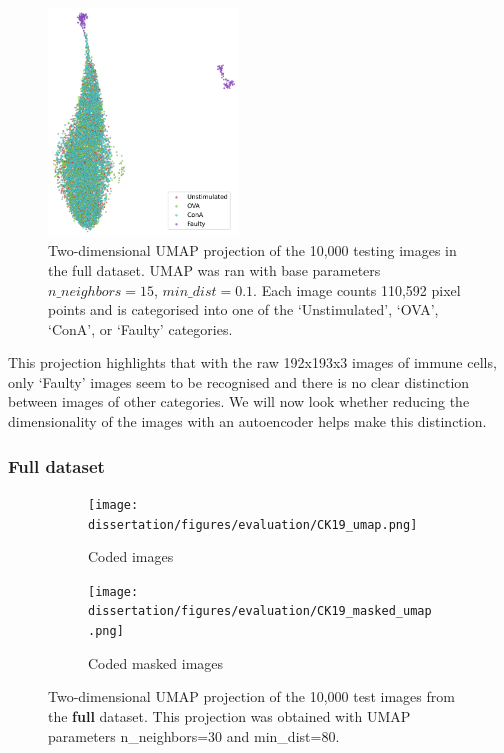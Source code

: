 \begin{figure}[h!]
    \centering
    \includegraphics[width=0.45\textwidth]{dissertation/figures/evaluation/CK19_baseline_visualisation.png}
    \caption{Two-dimensional UMAP projection of the 10,000 testing images in the full dataset. UMAP was ran with base parameters $n\_neighbors=15$, $min\_dist=0.1$. Each image counts 110,592 pixel points and is categorised into one of the `Unstimulated', `OVA', `ConA', or `Faulty' categories.}
    \label{fig:baseline_vis}
\end{figure}

This projection highlights that with the raw 192x193x3 images of immune cells, only `Faulty' images seem to be recognised and there is no clear distinction between images of other categories. We will now look whether reducing the dimensionality of the images with an autoencoder helps make this distinction.

\bigskip
\subsubsection{Full dataset}
\hfill
\hfill

\begin{figure}[h!]
    \centering
    \begin{subfigure}[h!]{0.45\textwidth}
        \texttt{[image: dissertation/figures/evaluation/CK19\_umap.png]}
        \caption{Coded images}
    \end{subfigure}
    \begin{subfigure}[h!]{0.45\textwidth}
        \texttt{[image: dissertation/figures/evaluation/CK19\_masked\_umap.png]}
        \caption{Coded masked images}
    \end{subfigure}
    \caption{Two-dimensional UMAP projection of the 10,000 test images from the \textbf{full} dataset. This projection was obtained with UMAP parameters n\_neighbors=30 and min\_dist=80.}
    \label{fig:full_projection}
\end{figure}

